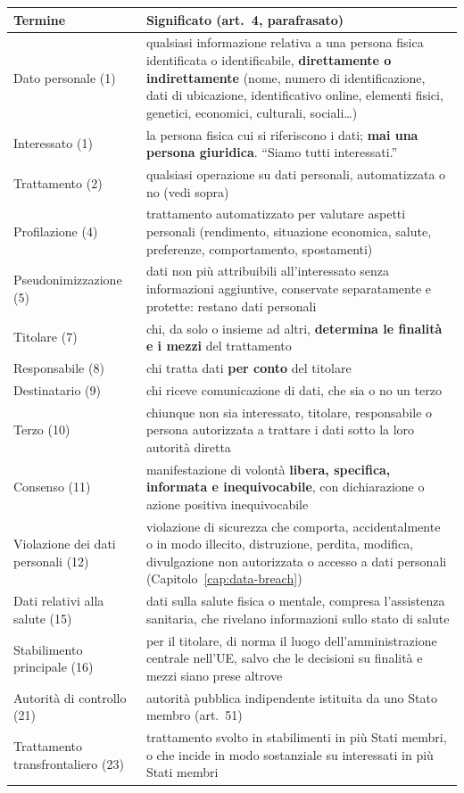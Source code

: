 \begingroup\small
\begin{longtable}{>{\raggedright\arraybackslash}p{3.2cm} >{\raggedright\arraybackslash}p{11.2cm}}
\toprule
\textbf{Termine} & \textbf{Significato (art.~4, parafrasato)}\\
\midrule
\endhead
Dato personale (1) & qualsiasi informazione relativa a una persona fisica identificata o
  identificabile, \textbf{direttamente o indirettamente} (nome, numero di identificazione, dati di
  ubicazione, identificativo online, elementi fisici, genetici, economici, culturali, sociali\ldots)\\
Interessato (1) & la persona fisica cui si riferiscono i dati; \textbf{mai una persona giuridica}. ``Siamo
  tutti interessati.''\\
Trattamento (2) & qualsiasi operazione su dati personali, automatizzata o no (vedi sopra)\\
Profilazione (4) & trattamento automatizzato per valutare aspetti personali (rendimento, situazione
  economica, salute, preferenze, comportamento, spostamenti)\\
Pseudonimizzazione (5) & dati non più attribuibili all'interessato senza informazioni aggiuntive,
  conservate separatamente e protette: restano dati personali\\
Titolare (7) & chi, da solo o insieme ad altri, \textbf{determina le finalità e i mezzi} del trattamento\\
Responsabile (8) & chi tratta dati \textbf{per conto} del titolare\\
Destinatario (9) & chi riceve comunicazione di dati, che sia o no un terzo\\
Terzo (10) & chiunque non sia interessato, titolare, responsabile o persona autorizzata a trattare i dati
  sotto la loro autorità diretta\\
Consenso (11) & manifestazione di volontà \textbf{libera, specifica, informata e inequivocabile}, con
  dichiarazione o azione positiva inequivocabile\\
Violazione dei dati personali (12) & violazione di sicurezza che comporta, accidentalmente o in modo
  illecito, distruzione, perdita, modifica, divulgazione non autorizzata o accesso a dati personali
  (Capitolo~\ref{cap:data-breach})\\
Dati relativi alla salute (15) & dati sulla salute fisica o mentale, compresa l'assistenza sanitaria, che
  rivelano informazioni sullo stato di salute\\
Stabilimento principale (16) & per il titolare, di norma il luogo dell'amministrazione centrale nell'UE,
  salvo che le decisioni su finalità e mezzi siano prese altrove\\
Autorità di controllo (21) & autorità pubblica indipendente istituita da uno Stato membro (art.~51)\\
Trattamento transfrontaliero (23) & trattamento svolto in stabilimenti in più Stati membri, o che incide
  in modo sostanziale su interessati in più Stati membri\\
\bottomrule
\end{longtable}
\endgroup

